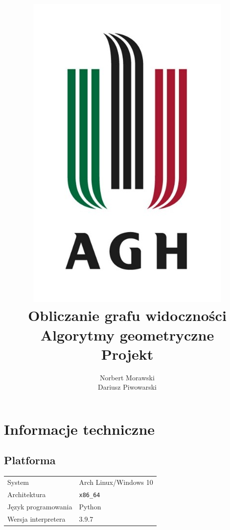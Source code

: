 \documentclass[12pt]{article}
\begin{document}
	
	\title{\includegraphics{agh.jpg} \\ Obliczanie grafu widoczności \\
		\vspace{0.4cm}
		\large Algorytmy geometryczne \\
		\large Projekt}
	\author{Norbert Morawski\\Dariusz Piwowarski}
	
	\maketitle
	\pagebreak
	\tableofcontents
	\pagebreak
	
	\section{Informacje techniczne}
	\subsection{Platforma}
		\begin{tabular}{l|l}
			System&Arch Linux/Windows 10\\
			Architektura&\texttt{x86\_64}\\
			Język programowania&Python\\
			Wersja interpretera&3.9.7\\
		\end{tabular}
\end{document}
